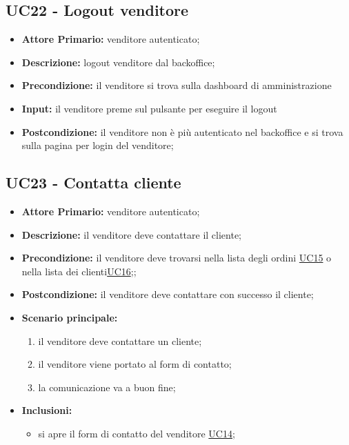 \subsection{UC22 - Logout venditore}
\label{UC22}
\begin{itemize}
    \item \textbf{Attore Primario:} venditore autenticato;
    \item \textbf{Descrizione:} logout venditore dal backoffice;
    \item \textbf{Precondizione:} il venditore si trova sulla dashboard di amministrazione
    \item \textbf{Input:} il venditore preme sul pulsante per eseguire il logout
    \item \textbf{Postcondizione:} il venditore non è più autenticato nel backoffice e si trova sulla pagina per login del venditore;
\end{itemize}

\subsection{UC23 - Contatta cliente}
\label{UC23}
\begin{itemize}
    \item \textbf{Attore Primario:} venditore autenticato;
    \item \textbf{Descrizione:} il venditore deve contattare il cliente;
    \item \textbf{Precondizione:} il venditore deve trovarsi nella lista degli ordini \hyperref[UC15]{UC15} o nella lista dei clienti\hyperref[UC16]{UC16};;
    \item \textbf{Postcondizione:} il venditore deve contattare con successo il cliente;
    \item \textbf{Scenario principale:}
    \begin{enumerate}
        \item il venditore deve contattare un cliente;
        \item il venditore viene portato al form di contatto;
        \item la comunicazione va a buon fine;
    \end{enumerate}
    \item \textbf{Inclusioni:}
    \begin{itemize}
        \item si apre il form di contatto del venditore \hyperref[UC14]{UC14};
    \end{itemize}
\end{itemize}

